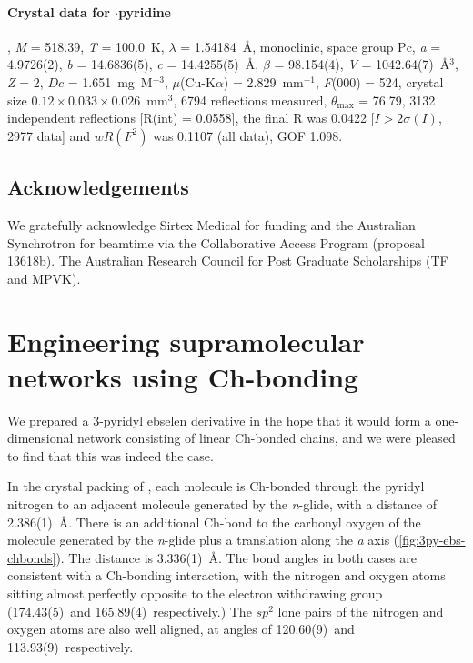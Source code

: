 \subsubsection{Crystal data for $\cdot$pyridine}
, \emph{M} = 518.39, \emph{T} = 100.0~K, $\lambda$ = 1.54184~\AA, monoclinic, space group Pc, \emph{a} = 4.9726(2), \emph{b} = 14.6836(5), \emph{c} = 14.4255(5)~\AA, $\beta$ = 98.154(4)\degree, \emph{V} = 1042.64(7)~\AA$^3$, \emph{Z} = 2, $Dc$ = 1.651~mg~M$^{-3}$, $\mu$(Cu-K$\alpha$) = 2.829~mm$^{-1}$, \emph{F}(000) = 524, crystal size $0.12 \times 0.033 \times 0.026$~mm$^3$, 6794 reflections measured, $\theta_{\mathrm{max}}$ = 76.79\degree, 3132 independent reflections [R(int) = 0.0558], the final R was 0.0422 [$I > 2\sigma(I)$, 2977 data] and $wR(F^2)$ was 0.1107 (all data), GOF 1.098.

\section{Acknowledgements}
We gratefully acknowledge Sirtex Medical for funding and the Australian Synchrotron for beamtime via the Collaborative Access Program (proposal 13618b).
The Australian Research Council for Post Graduate Scholarships (TF and MPVK).

\chapter{Engineering supramolecular networks using Ch-bonding}

We prepared a 3-pyridyl ebselen derivative  in the hope that it would form a one-dimensional network consisting of linear Ch-bonded chains, and we were pleased to find that this was indeed the case.

In the crystal packing of , each molecule is Ch-bonded through the pyridyl nitrogen to an adjacent molecule generated by the \textit{n}-glide, with a  distance of 2.386(1)~\AA.
There is an additional Ch-bond to the carbonyl oxygen of the molecule generated by the \textit{n}-glide plus a translation along the \textit{a} axis (\ref{fig:3py-ebs-chbonds}).
The  distance is 3.336(1)~\AA.
The bond angles in both cases are consistent with a Ch-bonding interaction, with the nitrogen and oxygen atoms sitting almost perfectly opposite to the electron withdrawing group (174.43(5)\degree~and 165.89(4)\degree~respectively.)
The $sp^2$ lone pairs of the nitrogen and oxygen atoms are also well aligned, at angles of 120.60(9)\degree~and 113.93(9)\degree~respectively.

